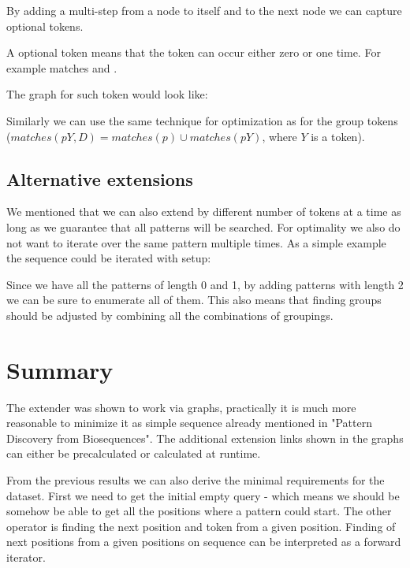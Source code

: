 By adding a multi-step from a node to itself and to the next node we can capture optional tokens.

\begin{exmp}
A optional token  means that the token  can occur either zero or one time. For example  matches  and .
\end{exmp}

The graph for such token would look like:

\begin{figure}[H]
	
\end{figure}

 Similarly we can use the same technique for optimization as for the group tokens ($matches(pY, D) = matches(p) \cup matches(pY)$, where $Y$ is a token).

\subsection{Alternative extensions}

We mentioned that we can also extend by different number of tokens at a time as long as we guarantee that all patterns will be searched. For optimality we also do not want to iterate over the same pattern multiple times. As a simple example the sequence  could be iterated with setup:

\begin{figure}[H]
	
\end{figure}

Since we have all the patterns of length 0 and 1, by adding patterns with length 2 we can be sure to enumerate all of them. This also means that finding groups should be adjusted by combining all the combinations of groupings.

\section{Summary}

The extender was shown to work via graphs, practically it is much more reasonable to minimize it as simple sequence already mentioned in "Pattern Discovery from Biosequences"\cite{spexs}. The additional extension links shown in the graphs can either be precalculated or calculated at runtime.

From the previous results we can also derive the minimal requirements for the dataset. First we need to get the initial empty query - which means we should be somehow be able to get all the positions where a pattern could start. The other operator is finding the next position and token from a given position. Finding of next positions from a given positions on sequence can be interpreted as a forward iterator.


